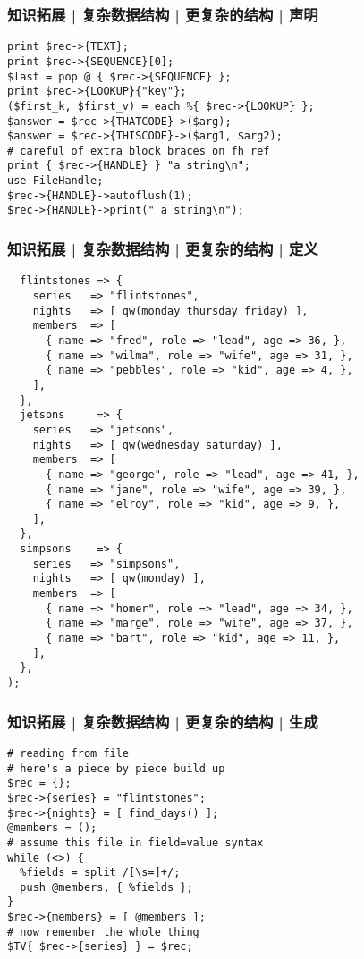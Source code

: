 \begin{frame}[fragile]
  \frametitle{知识拓展 | 复杂数据结构 | 更复杂的结构 | 声明}
\begin{lstlisting}
print $rec->{TEXT};
print $rec->{SEQUENCE}[0];
$last = pop @ { $rec->{SEQUENCE} };
print $rec->{LOOKUP}{"key"};
($first_k, $first_v) = each %{ $rec->{LOOKUP} };
$answer = $rec->{THATCODE}->($arg);
$answer = $rec->{THISCODE}->($arg1, $arg2);
# careful of extra block braces on fh ref
print { $rec->{HANDLE} } "a string\n";
use FileHandle;
$rec->{HANDLE}->autoflush(1);
$rec->{HANDLE}->print(" a string\n");
\end{lstlisting}
\end{frame}

\begin{frame}[fragile]
  \frametitle{知识拓展 | 复杂数据结构 | 更复杂的结构 | 定义}
  \vspace{-0.8em}
\begin{lstlisting}[basicstyle=\scriptsize\tt,numberstyle=\tiny]
%TV = (
  flintstones => {
    series   => "flintstones",
    nights   => [ qw(monday thursday friday) ],
    members  => [
      { name => "fred", role => "lead", age => 36, },
      { name => "wilma", role => "wife", age => 31, },
      { name => "pebbles", role => "kid", age => 4, },
    ],
  },
  jetsons     => {
    series   => "jetsons",
    nights   => [ qw(wednesday saturday) ],
    members  => [
      { name => "george", role => "lead", age => 41, },
      { name => "jane", role => "wife", age => 39, },
      { name => "elroy", role => "kid", age => 9, },
    ],
  },
  simpsons    => {
    series   => "simpsons",
    nights   => [ qw(monday) ],
    members  => [
      { name => "homer", role => "lead", age => 34, },
      { name => "marge", role => "wife", age => 37, },
      { name => "bart", role => "kid", age => 11, },
    ],
  },
);
\end{lstlisting}
\end{frame}

\begin{frame}[fragile]
  \frametitle{知识拓展 | 复杂数据结构 | 更复杂的结构 | 生成}
\begin{lstlisting}
# reading from file
# here's a piece by piece build up
$rec = {};
$rec->{series} = "flintstones";
$rec->{nights} = [ find_days() ];
@members = ();
# assume this file in field=value syntax
while (<>) {
  %fields = split /[\s=]+/;
  push @members, { %fields };
}
$rec->{members} = [ @members ];
# now remember the whole thing
$TV{ $rec->{series} } = $rec;
\end{lstlisting}
\end{frame}

